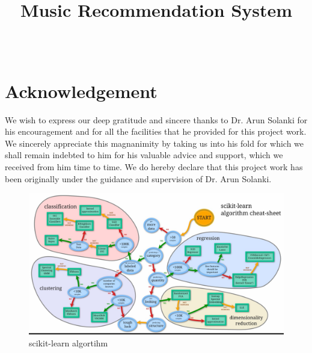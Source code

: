 \documentclass[paper=a4, fontsize=11pt]{scrartcl}
\title{
		\usefont{OT1}{bch}{b}{n}
		\horrule{0.5pt} \\[0.4cm]
		\huge Music Recommendation System \\
		\horrule{2pt} \\[0.5cm]
}
\numberwithin{equation}{section}		%
\numberwithin{figure}{section}			%
\numberwithin{table}{section}				%
\begin{document}
\maketitle

\section{Acknowledgement}
We wish to express our deep gratitude and sincere thanks to Dr. Arun Solanki for his encouragement and for all the facilities that he provided for this project work. We sincerely appreciate this magnanimity by taking us into his fold for which we shall remain indebted to him for his valuable advice and support, which we received from him time to time.
We do hereby declare that this project work has been originally under the guidance and supervision of Dr. Arun Solanki.
\begin{figure}[!b]
  \includegraphics[scale=0.2]{ml1.jpg}
  \caption{scikit-learn algortihm}
  \label{fig:boat1}
\end{figure}
\end{document}
